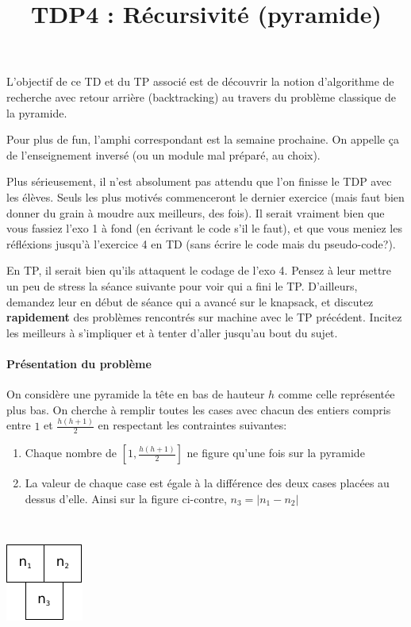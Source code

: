 \documentclass[10pt]{article}\usepackage[correction,nu]{esial}
\begin{document}
\color{black}
\title{TDP4 : Récursivité (pyramide)}
\maketitle

L'objectif de ce TD et du TP associé est de découvrir la notion d'algorithme de
recherche avec retour arrière (backtracking) au travers du problème classique de
la pyramide.

\begin{Reponse}
  Pour plus de fun, l'amphi correspondant est la semaine prochaine. On appelle
  ça de l'enseignement inversé (ou un module mal préparé, au choix).

  Plus sérieusement, il n'est absolument pas attendu que l'on finisse le TDP
  avec les élèves. Seuls les plus motivés commenceront le dernier exercice (mais
  faut bien donner du grain à moudre aux meilleurs, des fois). Il serait
  vraiment bien que vous fassiez l'exo 1 à fond (en écrivant le code s'il le
  faut), et que vous meniez les réfléxions jusqu'à l'exercice 4 en TD (sans
  écrire le code mais du pseudo-code?).

  En TP, il serait bien qu'ils attaquent le codage de l'exo 4. Pensez à leur
  mettre un peu de stress la séance suivante pour voir qui a fini le
  TP. D'ailleurs, demandez leur en début de séance qui a avancé sur le knapsack,
  et discutez \textbf{rapidement} des problèmes rencontrés sur machine avec le
  TP précédent. Incitez les meilleurs à s'impliquer et à tenter d'aller jusqu'au
  bout du sujet.
\end{Reponse}


\paragraph{Présentation du problème}

On considère une pyramide la tête en bas de hauteur $h$ comme celle
représentée plus bas. On cherche à remplir toutes les cases avec chacun des
entiers compris entre $1$ et $\frac{h(h+1)}{2}$ en respectant les contraintes
suivantes:

\begin{minipage}{.8\linewidth}
\begin{enumerate}
\item Chaque nombre de $\left[1,\frac{h(h+1)}{2}\right]$ ne figure qu'une fois sur la pyramide
\item La valeur de chaque case est égale à la différence des deux cases placées
  au dessus d'elle.
  Ainsi sur la figure ci-contre, $n_3=|n_1 - n_2|$
\end{enumerate}  
\end{minipage}~\begin{minipage}{.2\linewidth}
  \centering
  \includegraphics{img/pyramide3.pdf} 
\end{minipage}
\end{document}
